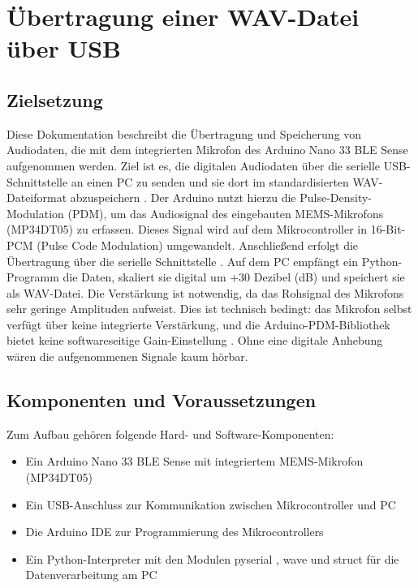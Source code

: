 \section{Übertragung einer WAV-Datei über USB}

\subsection{Zielsetzung}

Diese Dokumentation beschreibt die Übertragung und Speicherung von Audiodaten, die mit dem integrierten Mikrofon des Arduino Nano 33 BLE Sense aufgenommen werden. Ziel ist es, die digitalen Audiodaten über die serielle USB-Schnittstelle an einen PC zu senden und sie dort im standardisierten WAV-Dateiformat abzuspeichern \cite{Warden:2019}.  
Der Arduino nutzt hierzu die Pulse-Density-Modulation (PDM), um das Audiosignal des eingebauten MEMS-Mikrofons (MP34DT05) zu erfassen. Dieses Signal wird auf dem Mikrocontroller in 16-Bit-PCM (Pulse Code Modulation) umgewandelt. Anschließend erfolgt die Übertragung über die serielle Schnittstelle \cite{Warden:2019}.  
Auf dem PC empfängt ein Python-Programm die Daten, skaliert sie digital um +30 Dezibel (dB) und speichert sie als WAV-Datei. Die Verstärkung ist notwendig, da das Rohsignal des Mikrofons sehr geringe Amplituden aufweist. Dies ist technisch bedingt: das Mikrofon selbst verfügt über keine integrierte Verstärkung, und die Arduino-PDM-Bibliothek bietet keine softwareseitige Gain-Einstellung \cite{Warden:2019}. Ohne eine digitale Anhebung wären die aufgenommenen Signale kaum hörbar.

\subsection{Komponenten und Voraussetzungen}

Zum Aufbau gehören folgende Hard- und Software-Komponenten:

\begin{itemize}
    \item Ein Arduino Nano 33 BLE Sense mit integriertem MEMS-Mikrofon (MP34DT05) \cite{Warden:2019}
    \item Ein USB-Anschluss zur Kommunikation zwischen Mikrocontroller und PC
    \item Die Arduino IDE zur Programmierung des Mikrocontrollers
    \item Ein Python-Interpreter mit den Modulen pyserial \cite{PySerial:2025}, wave \cite{PythonWave:2025} und struct für die Datenverarbeitung am PC
\end{itemize}


